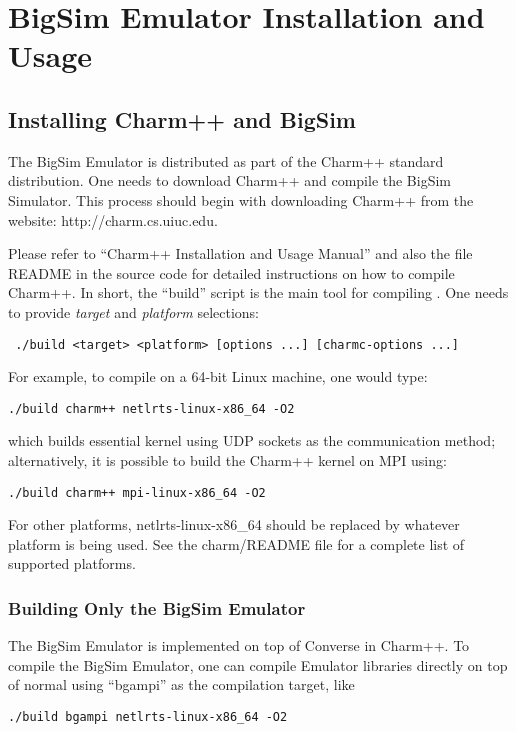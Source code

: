 \section{BigSim Emulator Installation and Usage}
\label{install}

\subsection{Installing Charm++ and BigSim}

    The BigSim Emulator is distributed as part of the Charm++ standard
distribution.  One needs to download Charm++ and compile the BigSim Simulator.
This process should begin with downloading Charm++ from the website:
http://charm.cs.uiuc.edu.

Please refer to ``Charm++ Installation and Usage Manual'' and also the file
README in the source code for detailed instructions on how to compile Charm++.
In short, the ``build'' script is the main tool for compiling \charmpp{}.  One
needs to provide {\em target} and {\em platform} selections: 
\begin{verbatim} ./build <target> <platform> [options ...] [charmc-options ...] \end{verbatim}

For example, to compile on a 64-bit Linux machine, one would type:
\begin{verbatim}
./build charm++ netlrts-linux-x86_64 -O2
\end{verbatim}

\noindent which builds essential \charmpp{} kernel using UDP sockets as the
communication method; alternatively, it is possible to build the Charm++ kernel
on MPI using:
\begin{verbatim}
./build charm++ mpi-linux-x86_64 -O2
\end{verbatim}

For other platforms, netlrts-linux-x86\_64 should be replaced by whatever platform is being used. 
See the charm/README file for a complete list of supported platforms.

\subsubsection{Building Only the BigSim Emulator}

The BigSim Emulator is implemented on top of Converse in Charm++.  To compile
the BigSim Emulator, one can compile Emulator libraries directly on top of
normal \charmpp{} using ``bgampi'' as the compilation target, like
\begin{verbatim}
./build bgampi netlrts-linux-x86_64 -O2
\end{verbatim}

